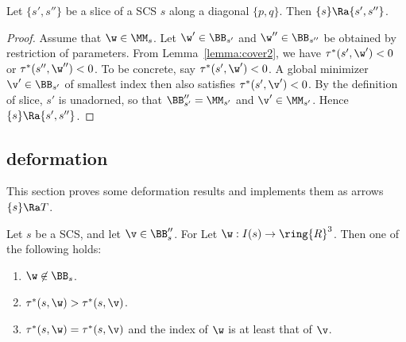 \begin{lemma}[slice]  
Let $\{s',s''\}$ be a slice of
a SCS $s$ along
a diagonal $\{p,q\}$.  
Then   $\{s\}\Ra\{s',s''\}$.
\end{lemma}

\begin{proof}
Assume that $\w\in\MM_s$.
Let $\w'\in \BB_{s'}$ and $\w''\in \BB_{s''}$ be obtained
by restriction of parameters.  From Lemma~\ref{lemma:cover2},
we have $\tau^*(s',\w')< 0$ or $\tau^*(s'',\w'')<0$.  To be
concrete, say $\tau^*(s',\w')< 0$.  A global minimizer $\v'\in\BB_{s'}$ of smallest index
then also satisfies $\tau^*(s',\v')< 0$.  By the definition of
slice, $s'$ is unadorned, so that $\BB''_{s'}=\MM_{s'}$ and
$\v'\in \MM_{s'}$.  Hence $\{s\}\Ra\{s',s''\}$.
\end{proof}


\subsection{deformation}

This section proves some deformation results and implements them
as arrows $\{s\}\Ra T$.

\begin{lemma} 
Let $s$ be a SCS, and let $\v\in\BB''_s$.  For
Let $\w:I(s)\to\ring{R}^3$.
Then  one of the following holds:
\begin{enumerate}
\item $\w\not\in \BB_s$.
\item $\tau^*(s,\w)> \tau^*(s,\v)$.
\item $\tau^*(s,\w)=\tau^*(s,\v)$ and the index of $\w$ is at least that of $\v$.
\end{enumerate}
\end{lemma}

